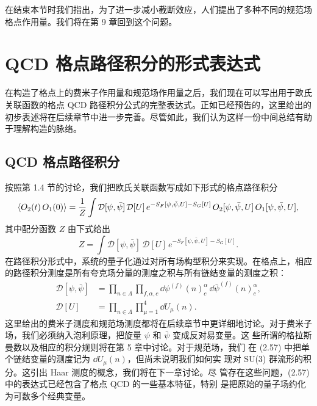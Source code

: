 在结束本节时我们指出，为了进一步减小截断效应，人们提出了多种不同的规范场
格点作用量。我们将在第 9 章回到这个问题。

\section{QCD 格点路径积分的形式表达式}

在构造了格点上的费米子作用量和规范场作用量之后，我们现在可以写出用于欧氏
关联函数的格点 QCD 路径积分公式的完整表达式。正如已经预告的，这里给出的
初步表述将在后续章节中进一步完善。尽管如此，我们认为这样一份中间总结有助
于理解构造的脉络。

\subsection{QCD 格点路径积分}

按照第 1.4 节的讨论，我们把欧氏关联函数写成如下形式的格点路径积分
\begin{equation}
  \left\langle O_2(t)\, O_1(0) \right\rangle = \frac{1}{Z} \int
    \mathcal{D}[\psi, \bar\psi]\, \mathcal{D}[U]\,
    e^{-S_F[\psi,\bar\psi,U] - S_G[U]}\,
    O_2[\psi, \bar\psi, U]\, O_1[\psi, \bar\psi, U] ,
\end{equation}
其中配分函数 $Z$ 由下式给出
\begin{equation}
  Z = \int \mathcal{D}[\psi, \bar\psi]\, \mathcal{D}[U]\,
    e^{-S_F[\psi,\bar\psi,U] - S_G[U]} .
\end{equation}
在路径积分形式中，系统的量子化通过对所有场构型积分来实现。在格点上，相应
的路径积分测度是所有夸克场分量的测度之积与所有链结变量的测度之积：
\begin{equation}
  \begin{split}
    \mathcal{D}[\psi, \bar\psi] &=
      \prod_{n\in\Lambda}\prod_{f,\alpha,c}
      \dd\psi^{(f)}(n)_c^\alpha\,
      \dd\bar\psi^{(f)}(n)_c^\alpha ,\\
    \mathcal{D}[U] &= \prod_{n\in\Lambda}\prod_{\mu=1}^{4} \dd U_\mu(n) .
  \end{split}
\end{equation}
这里给出的费米子测度和规范场测度都将在后续章节中更详细地讨论。对于费米子
场，我们必须纳入泡利原理，把旋量 $\psi$ 和 $\bar\psi$ 变成反对易变量。这
些所谓的格拉斯曼数以及相应的积分规则将在第 5 章中讨论。对于规范场，我们
在 (2.57) 中把单个链结变量的测度记为 $\dd U_\mu(n)$，但尚未说明我们如何实
现对 SU(3) 群流形的积分。这引出 Haar 测度的概念，我们将在下一章讨论。尽
管存在这些问题，(2.57) 中的表达式已经包含了格点 QCD 的一些基本特征，特别
是把原始的量子场约化为可数多个经典变量。

